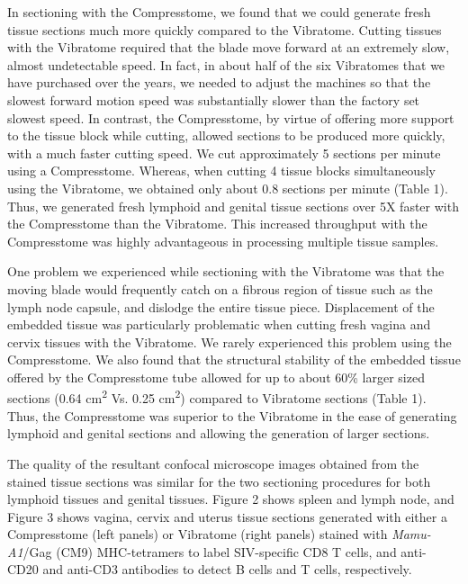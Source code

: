 \documentclass{article}
\begin{document}
In sectioning with the Compresstome, we found that we could generate fresh tissue sections much more quickly compared to the Vibratome. Cutting tissues with the Vibratome required that the blade move forward at an extremely slow, almost undetectable speed. In fact, in about half of the six Vibratomes that we have purchased over the years, we needed to adjust the machines so that the slowest forward motion speed was substantially slower than the factory set slowest speed. In contrast, the Compresstome, by virtue of offering more support to the tissue block while cutting, allowed sections to be produced more quickly, with a much faster cutting speed. We cut approximately 5 sections per minute using a Compresstome. Whereas, when cutting 4 tissue blocks simultaneously using the Vibratome, we obtained only about 0.8 sections per minute (Table 1). Thus, we generated fresh lymphoid and genital tissue sections over 5X faster with the Compresstome than the Vibratome. This increased throughput with the Compresstome was highly advantageous in processing multiple tissue samples.

One problem we experienced while sectioning with the Vibratome was that the moving blade would frequently catch on a fibrous region of tissue such as the lymph node capsule, and dislodge the entire tissue piece. Displacement of the embedded tissue was particularly problematic when cutting fresh vagina and cervix tissues with the Vibratome. We rarely experienced this problem using the Compresstome. We also found that the structural stability of the embedded tissue offered by the Compresstome tube allowed for up to about 60\% larger sized sections (0.64 cm\textsuperscript{2} Vs. 0.25 cm\textsuperscript{2}) compared to Vibratome sections (Table 1). Thus, the Compresstome was superior to the Vibratome in the ease of generating lymphoid and genital sections and allowing the generation of larger sections.

The quality of the resultant confocal microscope images obtained from the stained tissue sections was similar for the two sectioning procedures for both lymphoid tissues and genital tissues. Figure 2 shows spleen and lymph node, and Figure 3 shows vagina, cervix and uterus tissue sections generated with either a Compresstome (left panels) or Vibratome (right panels) stained with \textit{Mamu-A1}/Gag (CM9) MHC-tetramers to label SIV-specific CD8 T cells, and anti- CD20 and anti-CD3 antibodies to detect B cells and T cells, respectively.
\end{document}
